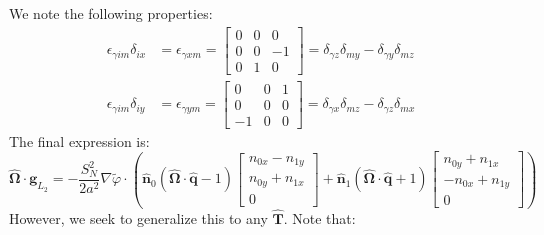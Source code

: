 \documentclass[reqno]{article}
\newcommand{\Omegahat}{\hat{\boldsymbol{\Omega}}}
\newcommand{\That}{\hat{\mathbf{T}}}
\newcommand{\phitilde}{\tilde{\varphi}}
\newcommand{\n}{\mathbf{\hat{n}}}
\newcommand{\q}{\mathbf{\hat{q}}}
\begin{document}
We note the following properties:
\begin{equation}
\begin{split}
    \epsilon_{\gamma i m} \delta_{i x}
    &=
    \epsilon_{\gamma x m}
    =
    \begin{bmatrix}
        0 &0 &0 \\
        0 &0 &-1 \\
        0 &1 &0
    \end{bmatrix} 
    =
    \delta_{\gamma z} \delta_{m y}
    - \delta_{\gamma y} \delta_{m z} \\
    \epsilon_{\gamma i m} \delta_{i y}
    &=
    \epsilon_{\gamma y m}
    =
    \begin{bmatrix}
        0 &0 &1 \\
        0 &0 &0 \\
        -1 &0 &0
    \end{bmatrix}
    =
    \delta_{\gamma x} \delta_{m z}
    - \delta_{\gamma z} \delta_{m x}
\end{split}
\end{equation}
The final expression is:
\begin{equation}
    \Omegahat \cdot \mathbf{g}_{L_2}
    =
    -\frac{S_N^2}{2 a^2}  \nabla \phitilde \cdot \left(
        \n_0
        \left( \Omegahat \cdot \q - 1 \right)
        \begin{bmatrix}
            n_{0x} - n_{1y} \\
            n_{0y} + n_{1x} \\
            0
        \end{bmatrix}
        +
        \n_1
        \left( \Omegahat \cdot \q + 1 \right)
        \begin{bmatrix}
            n_{0y} + n_{1x} \\
            -n_{0x} + n_{1y} \\
            0
        \end{bmatrix}
    \right)
\end{equation}
However, we seek to generalize this to any $\That$. 
Note that:
\end{document}

